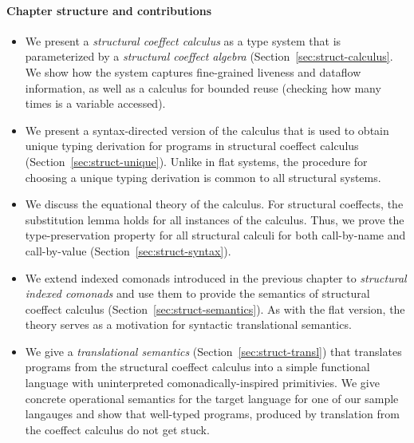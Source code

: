 \paragraph{Chapter structure and contributions}
\begin{itemize}
\item We present a \emph{structural coeffect calculus} as a type system that is parameterized
  by a \emph{structural coeffect algebra} (Section~\ref{sec:struct-calculus}. We show how the
  system captures fine-grained liveness and dataflow information, as well as a calculus for bounded
  reuse (checking how many times is a variable accessed).

\item We present a syntax-directed version of the calculus that is used to obtain unique typing
  derivation for programs in structural coeffect calculus (Section~\ref{sec:struct-unique}).
  Unlike in flat systems, the procedure for choosing a unique typing derivation is common to all
  structural systems.

\item We discuss the equational theory of the calculus. For structural coeffects, the substitution
  lemma holds for all instances of the calculus. Thus, we prove the type-preservation property
  for all structural calculi for both call-by-name and call-by-value (Section~\ref{sec:struct-syntax}).

\item We extend indexed comonads introduced in the previous chapter to \emph{structural indexed
  comonads} and use them to provide the semantics of structural coeffect calculus
  (Section~\ref{sec:struct-semantics}). As with the flat version, the theory serves as a motivation
  for syntactic translational semantics.

\item We give a \emph{translational semantics} (Section~\ref{sec:struct-transl}) that translates
  programs from the structural coeffect calculus into a simple functional language with
  uninterpreted comonadically-inspired primitivies. We give concrete operational semantics for the
  target language for one of our sample langauges and show that well-typed programs, produced by
  translation from the coeffect calculus do not get stuck.
\end{itemize}


%
%

